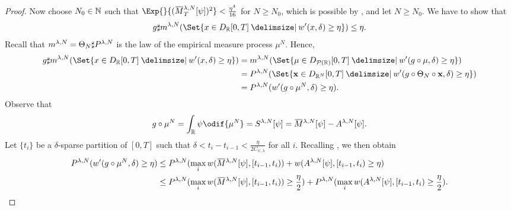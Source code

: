 \begin{proof}
  Now choose \( N_0 \in \mathbb{N} \) such that \(\Exp{}{ ( \ol{M}_T^{\lambda, N}[\psi] )^2 } < \frac{\eta^4}{16}\) for \( N \geq N_0 \), which is possible by , and let \(N \geq N_0\).
  We have to show that
  \begin{equation}
    g \sharp \lawmu^{\lambda, N}(\Set{ x \in D_{\potspace}[0,T] \given w'(x,\delta) \geq \eta }) \leq \eta.
  \end{equation}
  Recall that \(m^{\lambda, N} = \Theta_N \sharp P^{\lambda, N}\) is the law of the empirical measure process \(\mu^N\).
  Hence,
  \begin{equation}
    \begin{split}
      g \sharp \lawmu^{\lambda, N}(\Set{ x \in D_{\potspace}[0,T] \given w'(x,\delta) \geq \eta })
       & = \lawmu^{\lambda, N}(\Set{ \mu \in D_{\cP(\potspace)}[0,T] \given w'(g \circ \mu,\delta) \geq \eta })              \\
       & = P^{\lambda, N}(\Set{ \bm{x} \in D_{\potspace^N}[0,T] \given w'(g \circ \Theta_N \circ \bm{x},\delta) \geq \eta }) \\
       & = P^{\lambda, N}( w'(g \circ \mu^N,\delta) \geq \eta ).
    \end{split}
  \end{equation}
  Observe that
  \begin{equation}
    g \circ \mu^N = \int_\potspace \psi \odif{\mu^N} = S^{\lambda, N}[\psi] = \ol{M}^{\lambda, N}[\psi] - A^{\lambda, N}[\psi].
  \end{equation}
  Let \( \{t_i\} \) be a \( \delta \)-sparse partition of \( [0,T] \) such that \(\delta < t_i - t_{i-1} < \frac{\eta}{2C_{\psi, \lambda}}\) for all \( i \).
  Recalling , we then obtain %
  \begin{equation}
    \begin{split}
      P^{\lambda, N} (w'(g \circ \mu^N, \delta) \geq \eta)
       & \leq P^{\lambda, N}( \max_i w(\ol{M}^{\lambda, N}[\psi], [t_{i-1}, t_i)) + w(A^{\lambda, N}[\psi], [t_{i-1}, t_i) \geq \eta)                                                        \\
       & \leq P^{\lambda, N}( \max_i w(\ol{M}^{\lambda, N}[\psi], [t_{i-1}, t_i)) \geq \frac{\eta}{2}) + P^{\lambda, N}( \max_i w(A^{\lambda, N}[\psi], [t_{i-1}, t_i) \geq \frac{\eta}{2}).
    \end{split}

\end{equation}
\end{proof}
